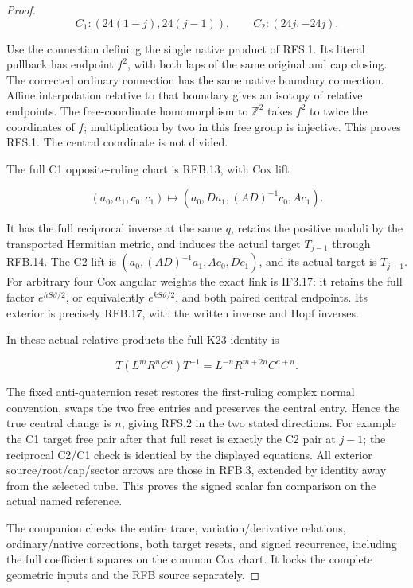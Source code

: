 \begin{proof}
\[
 C_1:(24(1-j),24(j-1)),\qquad C_2:(24j,-24j).
 \tag{RFS.17}
\]

Use the connection defining the single native product of RFS.1.
Its literal pullback has endpoint \(f^2\), with both laps of the
same original and cap closing. The corrected ordinary connection
has the same native boundary connection. Affine interpolation
relative to that boundary gives an isotopy of relative endpoints.
The free-coordinate homomorphism to \(\mathbb Z^2\) takes
\(f^2\) to twice the coordinates of \(f\); multiplication by two
in this free group is injective. This proves RFS.1. The central
coordinate is not divided.

The full C1 opposite-ruling chart is RFB.13, with Cox lift

\[
 (a_0,a_1,c_0,c_1)\mapsto
 (a_0,Da_1,(AD)^{-1}c_0,Ac_1).
\]

It has the full reciprocal inverse at the same \(q\), retains the
positive moduli by the transported Hermitian metric, and induces
the actual target \(T_{j-1}\) through RFB.14. The C2 lift is
\((a_0,(AD)^{-1}a_1,Ac_0,Dc_1)\), and its actual target is
\(T_{j+1}\). For arbitrary four Cox angular weights the exact
link is IF3.17: it retains the full factor
\(e^{hS\vartheta/2}\), or equivalently \(e^{kS\vartheta/2}\),
and both paired central endpoints. Its exterior is precisely
RFB.17, with the written inverse and Hopf inverses.

In these actual relative products the full K23 identity is

\[
 T(L^mR^nC^a)T^{-1}=L^{-n}R^{m+2n}C^{a+n}.
 \tag{RFS.18}
\]

The fixed anti-quaternion reset restores the first-ruling complex
normal convention, swaps the two free entries and preserves the
central entry. Hence the true central change is \(n\), giving
RFS.2 in the two stated directions. For example the C1 target
free pair after that full reset is exactly the C2 pair at \(j-1\);
the reciprocal C2/C1 check is identical by the displayed equations.
All exterior source/root/cap/sector arrows are those in RFB.3,
extended by identity away from the selected tube. This proves the
signed scalar fan comparison on the actual named reference.

The companion  checks
the entire trace, variation/derivative relations, ordinary/native
corrections, both target resets, and signed recurrence, including
the full coefficient squares on the common Cox chart. It locks the
complete geometric inputs and the RFB source separately.



\end{proof}
